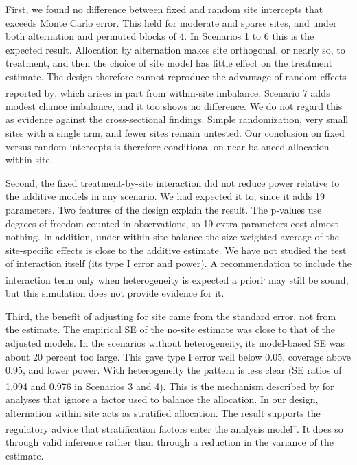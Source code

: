 \documentclass[
  11pt,
]{article}
\begin{document}
First, we found no difference between fixed and random site
intercepts that exceeds Monte Carlo error. This held for moderate
and sparse sites, and under both alternation and permuted blocks of
4. In Scenarios 1 to 6 this is the expected result. Allocation by
alternation makes site orthogonal, or nearly so, to treatment, and
then the choice of site model has little effect on the treatment
estimate. The design therefore cannot reproduce the advantage of
random effects reported by\textsuperscript{}, which arises in
part from within-site imbalance. Scenario 7 adds modest chance
imbalance, and it too shows no difference. We do not regard this as
evidence against the cross-sectional findings. Simple randomization,
very small sites with a single arm, and fewer sites remain
untested. Our conclusion on fixed versus random intercepts is
therefore conditional on near-balanced allocation within site.

Second, the fixed treatment-by-site interaction did not reduce
power relative to the additive models in any scenario. We had
expected it to, since it adds 19 parameters. Two features of the
design explain the result. The p-values use degrees of freedom
counted in observations, so 19 extra parameters cost almost
nothing. In addition, under within-site balance the size-weighted
average of the site-specific effects is close to the additive
estimate. We have not studied the test of interaction itself (its
type I error and power). A recommendation to include the interaction
term only when heterogeneity is expected a priori\textsuperscript{,} may still be
sound, but this simulation does not provide evidence for it.

Third, the benefit of adjusting for site came from the standard
error, not from the estimate. The empirical SE of the no-site
estimate was close to that of the adjusted models. In the scenarios
without heterogeneity, its model-based SE was about 20 percent too
large. This gave type I error well below 0.05, coverage above 0.95,
and lower power. With heterogeneity the pattern is less clear (SE
ratios of 1.094 and
0.976 in Scenarios 3 and 4). This is the
mechanism described by\textsuperscript{} for
analyses that ignore a factor used to balance the allocation. In our
design, alternation within site acts as stratified allocation. The
result supports the regulatory advice that stratification factors
enter the analysis model\textsuperscript{--}. It does so through valid inference rather than
through a reduction in the variance of the estimate.
\end{document}
